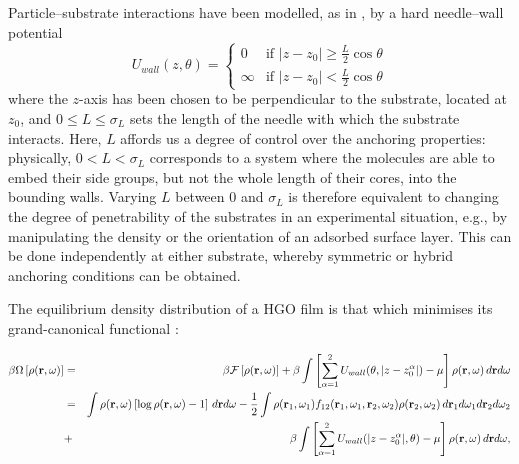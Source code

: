 \documentclass[aps,pre,twocolumn,groupedaddress,showpacs]{revtex4}
\begin{document}
Particle--substrate interactions have been modelled, as in 
\cite{Cleaver:2001,Barmes:2003}, by a hard needle--wall potential
\begin{equation}
\label{eq:surf}
U_{wall}(z,\theta) = \left\{ \begin{array}{ll}
0 & \mbox{if $\left|z-z_0 \right| \geq
\frac{L}{2}\cos\theta$}\\
\infty & \mbox{if $\left|z-z_0\right| < \frac{L}{2}\cos\theta$}      
\end{array} \right.
\end{equation}
where the $z$-axis has been chosen to be perpendicular 
to the substrate, located at $z_0$, and $0\le L\le \sigma_L$
sets the length of the needle with which the substrate interacts. Here, $L$
affords us a degree of control over the anchoring properties: physically, 
$0< L< \sigma_L$ corresponds to a system where the molecules are able to 
embed their side groups, but not the whole length of their cores, into the
bounding walls. Varying $L$ between 0 and $\sigma_L$ is therefore equivalent 
to changing the degree of penetrability of the substrates in an experimental
situation, e.g., by manipulating the density or the orientation of an 
adsorbed surface layer. This can be done independently at either substrate,
whereby symmetric or hybrid anchoring conditions can be obtained. 
\par
The equilibrium density distribution of a HGO film is that which 
minimises its grand-canonical functional \cite{Evans:1979}:
\begin{widetext}
\begin{eqnarray}
\label{eq:grand}
\beta\Omega\left[\rho({\bf r},\omega)\right]&=&
\beta {\cal F}\left[\rho({\bf r},\omega)\right]
+\beta\int \left[\sum_{\alpha=1}^2 U_{wall}(\theta,|z-z_0^{\alpha}|)
-\mu\right]\rho({\bf r},\omega)\,d{\bf r}d\omega\nonumber\\
&=&\int \rho({\bf r},\omega)\left[\log \rho({\bf
r},\omega) -1\right]\,d{\bf r}d\omega\nonumber
-{1\over 2}\int\rho({\bf r}_1,\omega_1)
f_{12}({\bf r}_1,\omega_1,{\bf r}_2,\omega_2)
\rho({\bf r}_2,\omega_2)\,d{\bf r}_1 d\omega_1 d{\bf r}_2 d\omega_2\\
&+&\beta\int \left[\sum_{\alpha=1}^2
U_{wall}(|z-z_0^{\alpha}|,\theta)
-\mu\right]\rho({\bf r},\omega)\,d{\bf r}d\omega,
\end{eqnarray}
\end{widetext}
\end{document}
